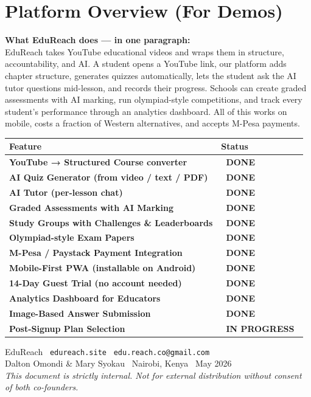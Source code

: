 \documentclass[12pt,a4paper]{article}
\newcommand{\badge}[2]{%
  \colorbox{#1}{\small\color{white}\textbf{\ #2\ }}%
}
\newcommand{\done}{\badge{emerald}{DONE}}
\newcommand{\inprog}{\badge{amber}{IN PROGRESS}}
\begin{document}
\section{Platform Overview (For Demos)}

\begin{mdframed}[linecolor=indigo, linewidth=1pt, innerleftmargin=12pt,
  innertopmargin=8pt, innerbottommargin=8pt, backgroundcolor=indigolight]
\textbf{What EduReach does — in one paragraph:}\\[4pt]
EduReach takes YouTube educational videos and wraps them in structure, accountability,
and AI. A student opens a YouTube link, our platform adds chapter structure, generates
quizzes automatically, lets the student ask the AI tutor questions mid-lesson, and
records their progress. Schools can create graded assessments with AI marking, run
olympiad-style competitions, and track every student's performance through an analytics
dashboard. All of this works on mobile, costs a fraction of Western alternatives,
and accepts M-Pesa payments.
\end{mdframed}

\vspace{0.5cm}
\begin{tabularx}{\linewidth}{>{\bfseries}X X}
\toprule
\textbf{Feature} & \textbf{Status} \\
\midrule
\rowcolor{rowgray}
YouTube → Structured Course converter & \done \\
AI Quiz Generator (from video / text / PDF) & \done \\
\rowcolor{rowgray}
AI Tutor (per-lesson chat) & \done \\
Graded Assessments with AI Marking & \done \\
\rowcolor{rowgray}
Study Groups with Challenges \& Leaderboards & \done \\
Olympiad-style Exam Papers & \done \\
\rowcolor{rowgray}
M-Pesa / Paystack Payment Integration & \done \\
Mobile-First PWA (installable on Android) & \done \\
\rowcolor{rowgray}
14-Day Guest Trial (no account needed) & \done \\
Analytics Dashboard for Educators & \done \\
\rowcolor{rowgray}
Image-Based Answer Submission & \done \\
Post-Signup Plan Selection & \inprog \\
\bottomrule
\end{tabularx}

\vfill
\begin{center}
\small\color{slate}
EduReach \textbar\ \texttt{edureach.site} \textbar\ \texttt{edu.reach.co@gmail.com}\\
Dalton Omondi \& Mary Syokau \textbar\ Nairobi, Kenya \textbar\ May 2026\\[4pt]
\textit{This document is strictly internal. Not for external distribution without consent of both co-founders.}
\end{center}
\end{document}
